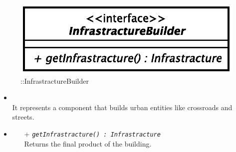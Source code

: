 \begin{figure}[h]
\centering
\includegraphics[scale=0.6,keepaspectratio]{images/solution/app/backend/infrastracture_builder.eps}
\caption{\pReactiveBuild::InfrastractureBuilder}
\label{fig:sd-app-Infrastracture-builder}
\end{figure}
\FloatBarrier
\begin{itemize}
  \item \textbf{\descr} \\
    It represents a component that builds urban entities like crossroads and
    streets.
  \item \textbf{\ops}
  \begin{itemize}
    \item[+] \texttt{\textit{getInfrastracture() : Infrastracture}} \\
Returns the final product of the building.
  \end{itemize}
\end{itemize}
